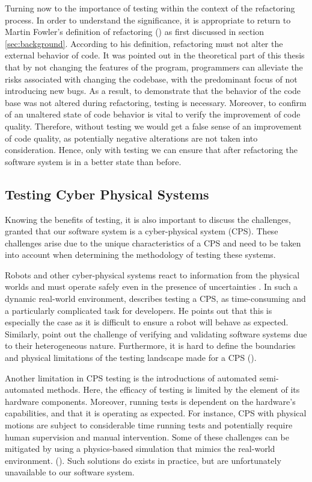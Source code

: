 Turning now to the importance of testing within the context of the refactoring process.  In order to understand the significance, it is appropriate to return to Martin Fowler's definition of refactoring (\cite{fowler2018}) as first discussed in section \ref{sec:background}. According to his definition, refactoring must not alter the external behavior of code. It was pointed out in the theoretical part of this thesis that by not changing the features of the program, programmers can alleviate the risks associated with changing the codebase, with the predominant focus of not introducing new bugs. As a result, to demonstrate that the behavior of the code base was not altered during refactoring, testing is necessary. Moreover, to confirm of an unaltered state of code behavior is vital to verify the improvement of code quality. Therefore, without testing we would get a false sense of an improvement of code quality, as potentially negative alterations are not taken into consideration. Hence, only with testing we can ensure that after refactoring the software system is in a better state than before.

\subsection{Testing Cyber Physical Systems}

Knowing the benefits of testing, it is also important to discuss the challenges, granted that our software system is a cyber-physical system (CPS). These challenges arise due to the unique characteristics of a CPS and need to be taken into account when determining the methodology of testing these systems. 

Robots and other cyber-physical systems react to information from the physical worlds and must operate safely even in the presence of uncertainties \cite{geissvolkermaria}. In such a dynamic real-world environment, \textcite{kapurpulkit2020} describes testing a CPS, as time-consuming and a particularly complicated task for developers. He points out that this is especially the case as it is difficult to ensure a robot will behave as expected. Similarly, \textcite{raikumar2010} point out the challenge of verifying and validating software systems due to their heterogeneous nature. Furthermore, it is hard to define the boundaries and physical limitations of the testing landscape made for a CPS (\cite{abbaspourasadollah2015}). 

Another limitation in CPS testing is the introductions of automated semi-automated methods. Here, the efficacy of testing is limited by the element of its hardware components. Moreover, running tests is dependent on the hardware's capabilities, and that it is operating as expected. For instance, CPS with physical motions are subject to considerable time running tests and potentially require human supervision and manual intervention. Some of these challenges can be mitigated by using a physics-based simulation that mimics the real-world environment. (\cite{kapurpulkit2020}). Such solutions do exists in practice, but are unfortunately unavailable to our software system.

